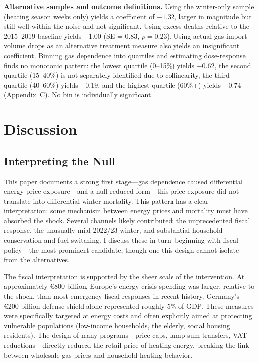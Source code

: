 \documentclass[12pt]{article}
\begin{document}
\textbf{Alternative samples and outcome definitions.} Using the winter-only sample (heating season weeks only) yields a coefficient of $-1.32$, larger in magnitude but still well within the noise and not significant. Using excess deaths relative to the 2015--2019 baseline yields $-1.00$ (SE = 0.83, $p = 0.23$). Using actual gas import volume drops as an alternative treatment measure also yields an insignificant coefficient. Binning gas dependence into quartiles and estimating dose-response finds no monotonic pattern: the lowest quartile (0--15\%) yields $-0.62$, the second quartile (15--40\%) is not separately identified due to collinearity, the third quartile (40--60\%) yields $-0.19$, and the highest quartile (60\%+) yields $-0.74$ (Appendix~C). No bin is individually significant.


\section{Discussion}
\label{sec:discussion}

\subsection{Interpreting the Null}

This paper documents a strong first stage---gas dependence caused differential energy price exposure---and a null reduced form---this price exposure did not translate into differential winter mortality. This pattern has a clear interpretation: some mechanism between energy prices and mortality must have absorbed the shock. Several channels likely contributed: the unprecedented fiscal response, the unusually mild 2022/23 winter, and substantial household conservation and fuel switching. I discuss these in turn, beginning with fiscal policy---the most prominent candidate, though one this design cannot isolate from the alternatives.

The fiscal interpretation is supported by the sheer scale of the intervention. At approximately \euro 800 billion, Europe's energy crisis spending was larger, relative to the shock, than most emergency fiscal responses in recent history. Germany's \euro 200 billion defense shield alone represented roughly 5\% of GDP. These measures were specifically targeted at energy costs and often explicitly aimed at protecting vulnerable populations (low-income households, the elderly, social housing residents). The design of many programs---price caps, lump-sum transfers, VAT reductions---directly reduced the retail price of heating energy, breaking the link between wholesale gas prices and household heating behavior.
\end{document}
